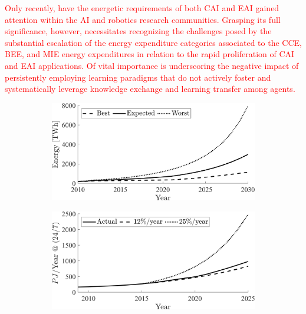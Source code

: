 \documentclass[12pt]{article}
\newcommand\myhl[1]{\textcolor{red}{#1}}
\begin{document}
\myhl{Only recently, have the energetic requirements of both CAI and EAI gained attention within the AI and robotics research communities. Grasping its full significance, however, necessitates recognizing the challenges posed by the substantial escalation of the energy expenditure categories associated to the CCE, BEE, and MIE energy expenditures in relation to the rapid proliferation of CAI and EAI applications. Of vital importance is underscoring the negative impact of persistently employing learning paradigms that do not actively foster and systematically leverage knowledge exchange and learning transfer among agents.}

\begin{figure}[!t]
	\centering
	\hspace*{\fill}
	\begin{subfigure}[t]{0.32\textwidth}
		\subcaption{}
		\includegraphics[width= \textwidth]{data_center_energy_consumption.png} \label{fig:dataCenterEnergy}
	\end{subfigure}
	\hfill
	\begin{subfigure}[t]{0.32\textwidth}
		\subcaption{}
		\includegraphics[width=\textwidth]{ir_energy_projections.png} \label{fig:ir_energy}
	\end{subfigure}
	\hfill
	\begin{subfigure}[t]{0.32\textwidth}

\end{subfigure}
\end{figure}
\end{document}
